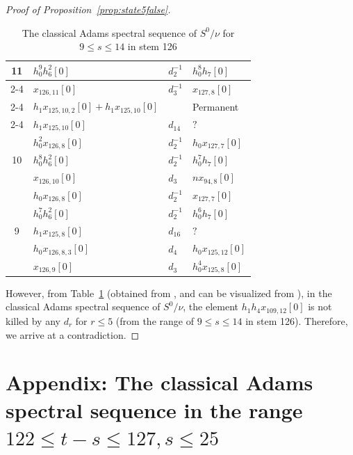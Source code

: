 \documentclass{amsart}
\numberwithin{equation}{section}
\begin{document}
\begin{proof}[Proof of Proposition~\ref{prop:state5false}]
\begin{table}[h]
{\begin{tabular}{|c|l|l|l|}
\multirow{4}{*}{11} & $h_0^9h_6^2[0]$ & $d_{2}^{-1}$ & $h_0^8h_7[0]$ \\\cline{2-4}
 & $x_{126,11}[0]$ & $d_{3}^{-1}$ & $x_{127,8}[0]$ \\\cline{2-4}
 & $h_1x_{125,10,2}[0]+h_1x_{125,10}[0]$ & & Permanent \\\cline{2-4}
 & $h_1x_{125,10}[0]$ & $d_{14}$ & $?$ \\\hline\hline
\multirow{3}{*}{10} & $h_0^2x_{126,8}[0]$ & $d_{2}^{-1}$ & $h_0x_{127,7}[0]$ \\\cline{2-4}
 & $h_0^8h_6^2[0]$ & $d_{2}^{-1}$ & $h_0^7h_7[0]$ \\\cline{2-4}
 & $x_{126,10}[0]$ & $d_{3}$ & $nx_{94,8}[0]$ \\\hline\hline
\multirow{5}{*}{9} & $h_0x_{126,8}[0]$ & $d_{2}^{-1}$ & $x_{127,7}[0]$ \\\cline{2-4}
 & $h_0^7h_6^2[0]$ & $d_{2}^{-1}$ & $h_0^6h_7[0]$ \\\cline{2-4}
 & $h_1x_{125,8}[0]$ & $d_{16}$ & $?$ \\\cline{2-4}
 & $h_0x_{126,8,3}[0]$ & $d_{4}$ & $h_0x_{125,12}[0]$ \\\cline{2-4}
 & $x_{126,9}[0]$ & $d_{3}$ & $h_0^4x_{125,8}[0]$ \\\hline %
%
%
\end{tabular}}
\caption{The classical Adams spectral sequence of $S^0/\nu$ for $9 \le s \le 14$ in stem 126}
\label{Table:Cnu126}
\end{table}

%

However, from Table~\ref{Table:Cnu126} (obtained from \cite{LWXMachine} \cite{LWXZenodo}, and can be visualized from \cite{LinPlot}), in the classical Adams spectral sequence of $S^0/\nu$, the element  $h_1h_4x_{109,12}[0]$ is not killed by any $d_r$ for $r \leq 5$ (from the range of $9 \le s \le 14$ in stem 126). Therefore, we arrive at a contradiction.
\end{proof}


%

\section{Appendix: The classical Adams spectral sequence in the range $122 \le t-s \le 127, s \le 25$} \label{sec:App}
\end{document}
